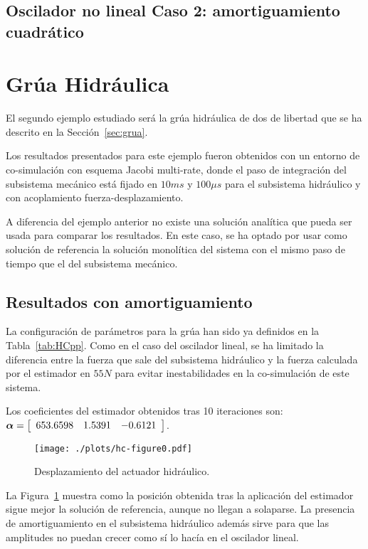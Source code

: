 \subsection{Oscilador no lineal Caso 2: amortiguamiento cuadrático}
\label{subsec:res_osciladorNL2}

\section{Grúa Hidráulica}
\label{sec:res_grua}

El segundo ejemplo estudiado será la grúa hidráulica de dos de libertad que se ha descrito en la Sección~\ref{sec:grua}. 

Los resultados presentados para este ejemplo fueron obtenidos con un entorno de co-simulación con esquema Jacobi multi-rate, donde el paso de integración del subsistema mecánico está fijado en $10\unit{ms}$ y $100\unit{\mu s}$ para el subsistema hidráulico y con acoplamiento fuerza-desplazamiento.

A diferencia del ejemplo anterior no existe una solución analítica que pueda ser usada para comparar los resultados.
En este caso, se ha optado por usar como solución de referencia la solución monolítica del sistema con el mismo paso de tiempo que el del subsistema mecánico.

\subsection{Resultados con amortiguamiento}
\label{subsec:res_grua}

La configuración de parámetros para la grúa han sido ya definidos en la Tabla~\ref{tab:HCpp}.
Como en el caso del oscilador lineal, se ha limitado la diferencia entre la fuerza que sale del subsistema hidráulico y la fuerza calculada por el estimador en $55\unit{N}$ para evitar inestabilidades en la co-simulación de este sistema.


Los coeficientes del estimador obtenidos tras 10 iteraciones son:
$\coefficients = \sqbr{\matr{ccc}{653.6598 & 1.5391 & -0.6121}}$.


\begin{figure}[ht!]\centering
	\texttt{[image: ./plots/hc-figure0.pdf]}
	\caption{Desplazamiento del actuador hidráulico.}
	\label{fig:GruaPos}
\end{figure}

La Figura~\ref{fig:GruaPos} muestra como la posición obtenida tras la aplicación del estimador sigue mejor la solución de referencia, aunque no llegan a solaparse.
La presencia de amortiguamiento en el subsistema hidráulico además sirve para que las amplitudes no puedan crecer como sí lo hacía en el oscilador lineal.


